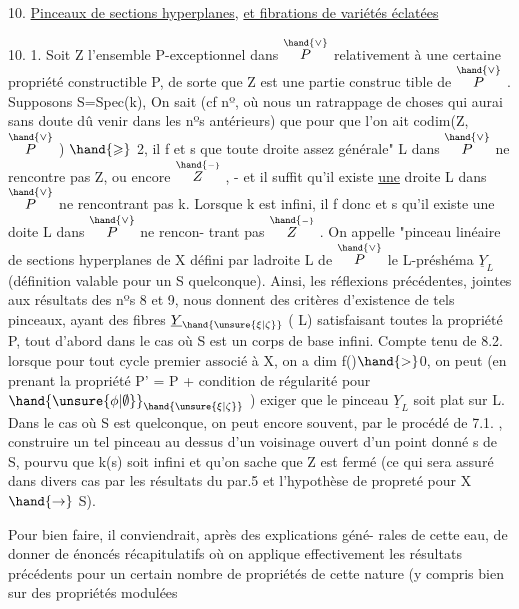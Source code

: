 
10. \uline{Pinceaux de sections hyperplanes}, \uline{et fibrations de variétés éclatées}

10. 1. Soit Z l'ensemble P-exceptionnel dans $\overset{\hand{\vee}}{P}$ relativement à une
certaine propriété constructible P, de sorte que Z est une partie construc%
tible de $\overset{\hand{\vee}}{P}$ . Supposons S=Spec(k), On sait (cf nº, où nous  un ratrappage
\placedmargin{$/$}de choses qui aurai sans doute dû venir dans les nºs antérieurs) que pour que
l'on ait codim(Z,$\overset{\hand{\vee}}{P}$ ) $\hand{\geqslant}$ 2, il f et s que toute droite assez
générale" L dans $\overset{\hand{\vee}}{P}$ ne rencontre pas Z,  ou encore $\overset{\hand{\scriptscriptstyle -}}{Z}$ , - et il suffit
qu'il existe \uline{une} droite L dans $\overset{\hand{\vee}}{P}$ ne rencontrant pas k. Lorsque 
k est infini, il f donc et s qu'il existe une doite L \placedmargin{\unsure{$-$|$\wedge$}}dans $\overset{\hand{\vee}}{P}$ ne rencon-%
trant pas $\overset{\hand{\scriptscriptstyle -}}{Z}$ . On appelle "pinceau linéaire de sections hyperplanes de X défini par ladroite
L de $\overset{\hand{\vee}}{P}$\hand{,} le L-préshéma $\underline{Y}_L$ (définition valable pour un S quelconque).
Ainsi, les réflexions précédentes, jointes aux résultats des nºs 8 et 9,
nous donnent des critères d'existence de tels pinceaux, ayant des fibres
$\underline{Y}_{\hand{\unsure{\xi|\zeta}}}$ ( \hand{$\unsure{\xi|\zeta} \in$}L) satisfaisant toutes la propriété P, tout d'abord dans le
cas  où S est un corps de base infini.  Compte tenu de
8.2.\hand{,} lorsque  pour tout cycle premier associé à X, on a dim f()$\hand{>}$0,
on peut (en prenant la propriété P' = P + condition de régularité
pour $\hand{\unsure{\phi|\emptyset}}_{\hand{\unsure{\xi|\zeta}}}$ ) exiger que le pinceau $\underline{Y}_L$ soit plat sur L. Dans le cas
où S est quelconque, on peut encore souvent, par le procédé de 7.1. ,
construire un tel pinceau au dessus d'un voisinage ouvert d'un point
donné s de S, pourvu que k(s) soit infini et qu'on sache que Z est fermé
(ce qui sera assuré dans divers cas par les résultats du par.5 et
l'hypothèse de propreté pour X $\hand{\rightarrow}$ S).

\placedmargin{|} Pour bien faire, il conviendrait, après des explications géné-%
rales de cette eau, de donner de énoncés récapitulatifs où on
applique effectivement les résultats précédents pour un certain nombre
de propriétés de cette nature (y compris bien sur des propriétés modulées\hand{)}

